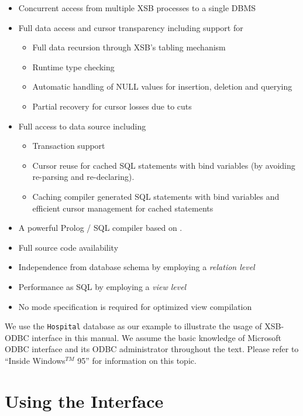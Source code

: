\begin{itemize} 
\item Concurrent access from multiple XSB processes to a single DBMS
\item Full data access and cursor transparency including support for
        \begin{itemize}
        \item Full data recursion through XSB's tabling mechanism
        \item Runtime type checking
        \item Automatic handling of NULL values for insertion, 
                deletion and querying
        \item Partial recovery for cursor losses due to cuts
        \end{itemize}
\item Full access to data source including
        \begin{itemize}
        \item Transaction support
        \item Cursor reuse for cached SQL statements 
                with bind variables (by avoiding re-parsing and re-declaring).
        \item Caching compiler generated SQL statements with bind variables 
                and efficient cursor management for cached statements
        \end{itemize}
\item A powerful Prolog / SQL compiler based on \cite{Drax92}.
\item Full source code availability
\item Independence from database schema by employing a {\it relation level}
\item Performance as SQL by employing a {\it view level} 
\item No mode specification is required for optimized view compilation
\end{itemize}

We use the {\tt Hospital} database as our example to illustrate 
the usage of XSB-ODBC interface in this manual. We assume the basic 
knowledge of Microsoft ODBC interface and its ODBC administrator 
throughout the text.  Please refer to ``Inside Windows$^{TM}$ 95''
 for information on this topic.

\section{Using the Interface}

